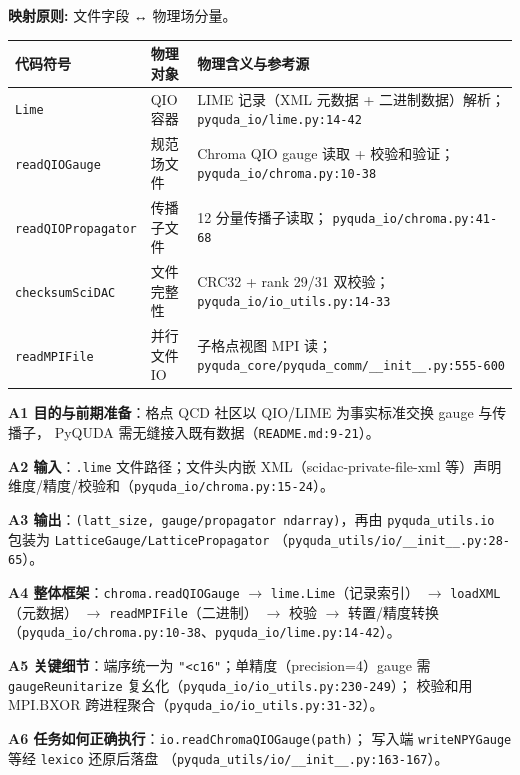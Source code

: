 \documentclass[UTF8]{ctexart}
\begin{document}
\begin{mapbox}
\textbf{映射原则:} 文件字段 ↔ 物理场分量。
\end{mapbox}
\begin{xltabular}{\textwidth}{llX}
\toprule
\textcolor{map}{代码符号} & 物理对象 & 物理含义与参考源 \\
\midrule
\endhead
\texttt{Lime} & QIO 容器 & LIME 记录（XML 元数据 + 二进制数据）解析；
\texttt{\nolinkurl{pyquda_io/lime.py:14-42}} \\
\texttt{readQIOGauge} & 规范场文件 & Chroma QIO gauge 读取 + 校验和验证；
\texttt{\nolinkurl{pyquda_io/chroma.py:10-38}} \\
\texttt{readQIOPropagator} & 传播子文件 & 12 分量传播子读取；
\texttt{\nolinkurl{pyquda_io/chroma.py:41-68}} \\
\texttt{checksumSciDAC} & 文件完整性 & CRC32 + rank 29/31 双校验；
\texttt{\nolinkurl{pyquda_io/io_utils.py:14-33}} \\
\texttt{readMPIFile} & 并行文件 IO & 子格点视图 MPI 读；
\texttt{\nolinkurl{pyquda_core/pyquda_comm/__init__.py:555-600}} \\
\bottomrule
\end{xltabular}

\textbf{A1 目的与前期准备}：格点 QCD 社区以 QIO/LIME 为事实标准交换 gauge 与传播子，
PyQUDA 需无缝接入既有数据（\texttt{\nolinkurl{README.md:9-21}}）。

\textbf{A2 输入}：\texttt{.lime} 文件路径；文件头内嵌 XML（scidac-private-file-xml
等）声明维度/精度/校验和（\texttt{\nolinkurl{pyquda_io/chroma.py:15-24}}）。

\textbf{A3 输出}：\texttt{(latt\_size, gauge/propagator ndarray)}，再由
\texttt{pyquda\_utils.io} 包装为 \texttt{LatticeGauge/LatticePropagator}
（\texttt{\nolinkurl{pyquda_utils/io/__init__.py:28-65}}）。

\textbf{A4 整体框架}：\texttt{chroma.readQIOGauge} $\rightarrow$
\texttt{lime.Lime}（记录索引） $\rightarrow$ \texttt{loadXML}（元数据）
$\rightarrow$ \texttt{readMPIFile}（二进制） $\rightarrow$ 校验 $\rightarrow$ 转置/精度转换
（\texttt{\nolinkurl{pyquda_io/chroma.py:10-38}}、\texttt{\nolinkurl{pyquda_io/lime.py:14-42}}）。

\textbf{A5 关键细节}：端序统一为 \texttt{"<c16"}；单精度（precision=4）gauge 需
\texttt{gaugeReunitarize} 复幺化（\texttt{\nolinkurl{pyquda_io/io_utils.py:230-249}}）；
校验和用 MPI.BXOR 跨进程聚合（\texttt{\nolinkurl{pyquda_io/io_utils.py:31-32}}）。

\textbf{A6 任务如何正确执行}：\texttt{io.readChromaQIOGauge(path)}；
写入端 \texttt{writeNPYGauge} 等经 \texttt{lexico} 还原后落盘
（\texttt{\nolinkurl{pyquda_utils/io/__init__.py:163-167}}）。
\end{document}

